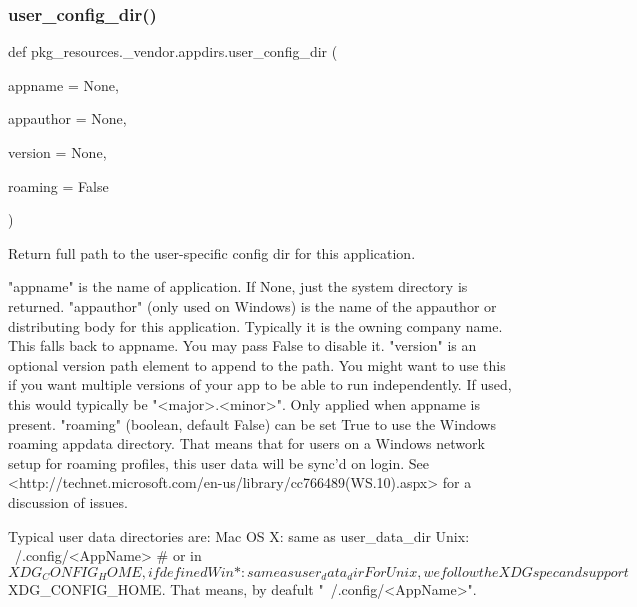 \subsubsection{\texorpdfstring{user\+\_\+config\+\_\+dir()}{user\_config\_dir()}}
{\footnotesize\ttfamily def pkg\+\_\+resources.\+\_\+vendor.\+appdirs.\+user\+\_\+config\+\_\+dir (\begin{DoxyParamCaption}\item[{}]{appname = {\ttfamily None},  }\item[{}]{appauthor = {\ttfamily None},  }\item[{}]{version = {\ttfamily None},  }\item[{}]{roaming = {\ttfamily False} }\end{DoxyParamCaption})}

\begin{DoxyVerb}Return full path to the user-specific config dir for this application.

    "appname" is the name of application.
        If None, just the system directory is returned.
    "appauthor" (only used on Windows) is the name of the
        appauthor or distributing body for this application. Typically
        it is the owning company name. This falls back to appname. You may
        pass False to disable it.
    "version" is an optional version path element to append to the
        path. You might want to use this if you want multiple versions
        of your app to be able to run independently. If used, this
        would typically be "<major>.<minor>".
        Only applied when appname is present.
    "roaming" (boolean, default False) can be set True to use the Windows
        roaming appdata directory. That means that for users on a Windows
        network setup for roaming profiles, this user data will be
        sync'd on login. See
        <http://technet.microsoft.com/en-us/library/cc766489(WS.10).aspx>
        for a discussion of issues.

Typical user data directories are:
    Mac OS X:               same as user_data_dir
    Unix:                   ~/.config/<AppName>     # or in $XDG_CONFIG_HOME, if defined
    Win *:                  same as user_data_dir

For Unix, we follow the XDG spec and support $XDG_CONFIG_HOME.
That means, by deafult "~/.config/<AppName>".
\end{DoxyVerb}
 \mbox{\label{namespacepkg__resources_1_1__vendor_1_1appdirs_a3b03c46f6524b886b726517c7f76dad4}} 
